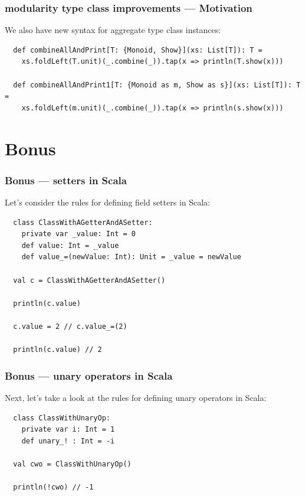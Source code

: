 \documentclass{beamer}
\begin{document}
\begin{frame}[fragile]
  \frametitle{modularity type class improvements --- Motivation}

  We also have new syntax for aggregate type class instances:

  \begin{lstlisting}
  def combineAllAndPrint[T: {Monoid, Show}](xs: List[T]): T =
    xs.foldLeft(T.unit)(_.combine(_)).tap(x => println(T.show(x)))

  def combineAllAndPrint1[T: {Monoid as m, Show as s}](xs: List[T]): T =
    xs.foldLeft(m.unit)(_.combine(_)).tap(x => println(s.show(x)))
  \end{lstlisting}

\end{frame}

\section{Bonus}

\begin{frame}[fragile]
  \frametitle{Bonus --- setters in Scala}

  Let's consider the rules for defining field setters in Scala:

  \begin{lstlisting}
  class ClassWithAGetterAndASetter:
    private var _value: Int = 0
    def value: Int = _value
    def value_=(newValue: Int): Unit = _value = newValue

  val c = ClassWithAGetterAndASetter()

  println(c.value)

  c.value = 2 // c.value_=(2)

  println(c.value) // 2
  \end{lstlisting}

\end{frame}

\begin{frame}[fragile]
  \frametitle{Bonus --- unary operators in Scala}

  Next, let's take a look at the rules for defining unary operators in Scala:

  \begin{lstlisting}
  class ClassWithUnaryOp:
    private var i: Int = 1
    def unary_! : Int = -i

  val cwo = ClassWithUnaryOp()

  println(!cwo) // -1
  \end{lstlisting}

\end{frame}
\end{document}
